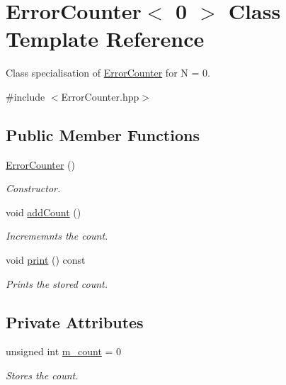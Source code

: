 \hypertarget{class_error_counter_3_010_01_4}{}\section{Error\+Counter$<$ 0 $>$ Class Template Reference}
\label{class_error_counter_3_010_01_4}


Class specialisation of \hyperlink{class_error_counter}{Error\+Counter} for N = 0.  




{\ttfamily \#include $<$Error\+Counter.\+hpp$>$}

\subsection*{Public Member Functions}
\begin{DoxyCompactItemize}
\item 
\hyperlink{class_error_counter_3_010_01_4_a69313d6eb139dddcb69a66ea412cf6bb}{Error\+Counter} ()
\begin{DoxyCompactList}\small\item\em Constructor. \end{DoxyCompactList}\item 
void \hyperlink{class_error_counter_3_010_01_4_a163b6f85e0c41d1af2317787d8a256c2}{add\+Count} ()
\begin{DoxyCompactList}\small\item\em Incrememnts the count. \end{DoxyCompactList}\item 
void \hyperlink{class_error_counter_3_010_01_4_a243e60fd839d5dc2b866adc3f6713cb7}{print} () const
\begin{DoxyCompactList}\small\item\em Prints the stored count. \end{DoxyCompactList}\end{DoxyCompactItemize}
\subsection*{Private Attributes}
\begin{DoxyCompactItemize}
\item 
unsigned int \hyperlink{class_error_counter_3_010_01_4_a463da41b6db10ef23b59ff7e6a372a8e}{m\+\_\+count} = 0
\begin{DoxyCompactList}\small\item\em Stores the count. \end{DoxyCompactList}\end{DoxyCompactItemize}



